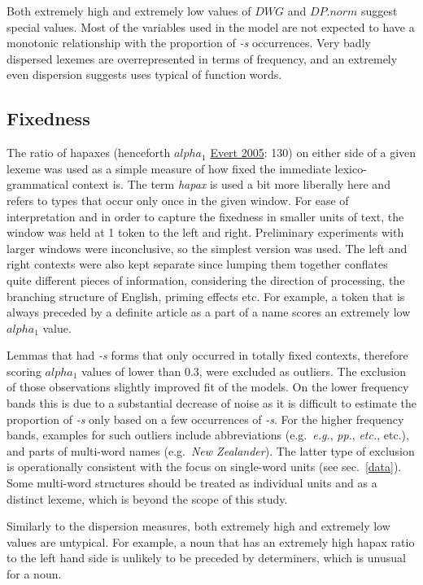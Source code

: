 \documentclass[
]{article}
\begin{document}
Both extremely high and extremely low values of \(DWG\) and \(DP.norm\)
suggest special values. Most of the variables used in the model are not
expected to have a monotonic relationship with the proportion of
\emph{-s} occurrences. Very badly dispersed lexemes are overrepresented
in terms of frequency, and an extremely even dispersion suggests uses
typical of function words.

\hypertarget{hapax}{%
\subsection{Fixedness}\label{hapax}}

The ratio of hapaxes (henceforth \(alpha_{1}\)
\protect\hyperlink{ref-evert05}{Evert 2005}: 130) on either side of a
given lexeme was used as a simple measure of how fixed the immediate
lexico-grammatical context is. The term \emph{hapax} is used a bit more
liberally here and refers to types that occur only once in the given
window. For ease of interpretation and in order to capture the fixedness
in smaller units of text, the window was held at 1 token to the left and
right. Preliminary experiments with larger windows were inconclusive, so
the simplest version was used. The left and right contexts were also
kept separate since lumping them together conflates quite different
pieces of information, considering the direction of processing, the
branching structure of English, priming effects etc. For example, a
token that is always preceded by a definite article as a part of a name
scores an extremely low \(alpha_{1}\) value.

Lemmas that had \emph{-s} forms that only occurred in totally fixed
contexts, therefore scoring \(alpha_{1}\) values of lower than 0.3, were
excluded as outliers. The exclusion of those observations slightly
improved fit of the models. On the lower frequency bands this is due to
a substantial decrease of noise as it is difficult to estimate the
proportion of \emph{-s} only based on a few occurrences of \emph{-s}.
For the higher frequency bands, examples for such outliers include
abbreviations (e.g.~\emph{e.g.}, \emph{pp.}, \emph{etc.}, etc.), and
parts of multi-word names (e.g.~\emph{New Zealander}). The latter type
of exclusion is operationally consistent with the focus on single-word
units (see sec.~\ref{data}). Some multi-word structures should be
treated as individual units and as a distinct lexeme, which is beyond
the scope of this study.

Similarly to the dispersion measures, both extremely high and extremely
low values are untypical. For example, a noun that has an extremely high
hapax ratio to the left hand side is unlikely to be preceded by
determiners, which is unusual for a noun.
\end{document}
